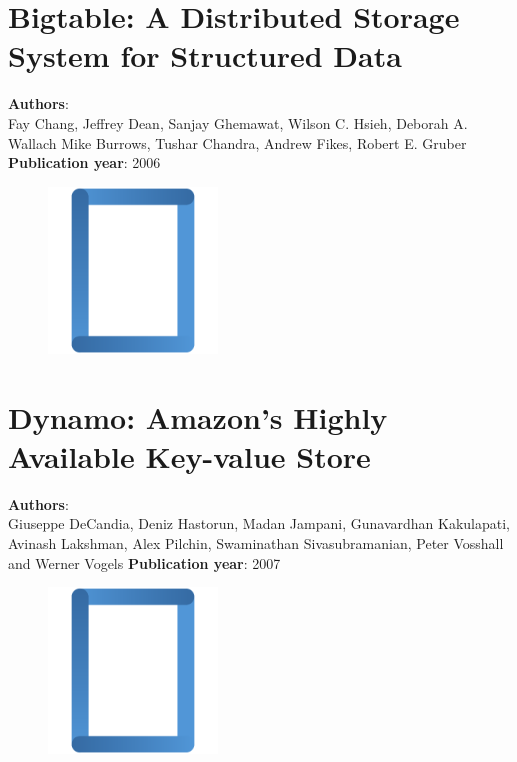 \documentclass[11pt,fleqn]{book} %
\begin{document}
\chapter{Bigtable: A Distributed Storage System for Structured Data}
\vspace*{-7mm}
\Large \textbf{Authors}: \\
Fay Chang, Jeffrey Dean, Sanjay Ghemawat, Wilson C. Hsieh, Deborah A. Wallach Mike Burrows, Tushar Chandra, Andrew Fikes, Robert E. Gruber
\newline\newline
\textbf{Publication year}: 2006
\begin{figure}[b]
    \centering
    \includegraphics[width=0.4\textwidth]{distributed-systems-rectangle-blue.pdf}
\end{figure}


\chapter{Dynamo: Amazon’s Highly Available Key-value Store}
\vspace*{-7mm}
\Large \textbf{Authors}: \\
Giuseppe DeCandia, Deniz Hastorun, Madan Jampani, Gunavardhan Kakulapati, Avinash Lakshman, Alex Pilchin, Swaminathan Sivasubramanian, Peter Vosshall and Werner Vogels
\newline\newline
\textbf{Publication year}: 2007
\begin{figure}[b]
    \centering
    \includegraphics[width=0.4\textwidth]{distributed-systems-rectangle-blue.pdf}
\end{figure}

\end{document}
